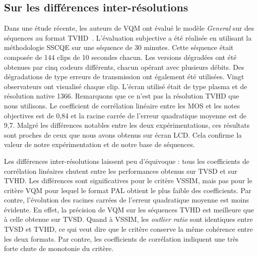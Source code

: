 \subsection{Sur les différences inter-résolutions}
Dans une étude récente, les auteurs de VQM ont évalué le modèle \emph{General} sur des séquences au format TVHD~\cite{wolf-vpqm2007}. L'évaluation subjective a été réalisée en utilisant la méthodologie SSCQE sur une séquence de 30 minutes. Cette séquence était composée de 144 clips de 10 secondes chacun. Les versions dégradées ont été obtenues par cinq codeurs différents, chacun opérant avec plusieurs débits. Des dégradations de type erreurs de transmission ont également été utilisées. Vingt observateurs ont visualisé chaque clip. L'écran utilisé était de type plasma et de résolution native 1366. Remarquons que ce n'est pas la résolution TVHD que nous utilisons. Le coefficient de corrélation linéaire entre les MOS et les notes objectives est de 0,84 et la racine carrée de l'erreur quadratique moyenne est de 9,7. Malgré les différences notables entre les deux expérimentations, ces résultats sont proches de ceux que nous avons obtenus sur écran LCD. Cela confirme la valeur de notre expérimentation et de notre base de séquences.

Les différences inter-résolutions laissent peu d'équivoque : tous les coefficients de corrélation linéaires chutent entre les performances obtenus sur TVSD et sur TVHD. Les différences sont significatives pour le critère VSSIM, mais pas pour le critère VQM pour lequel le format PAL obtient le plus faible des coefficients. Par contre, l'évolution des racines carrées de l'erreur quadratique moyenne est moins évidente. En effet, la précision de VQM sur les séquences TVHD est meilleure que à celle obtenue sur TVSD. Quand à VSSIM, les \emph{outlier ratio} sont identiques entre TVSD et TVHD, ce qui veut dire que le critère conserve la même cohérence entre les deux formats. Par contre, les coefficients de corrélation indiquent une très forte chute de monotonie du critère.


